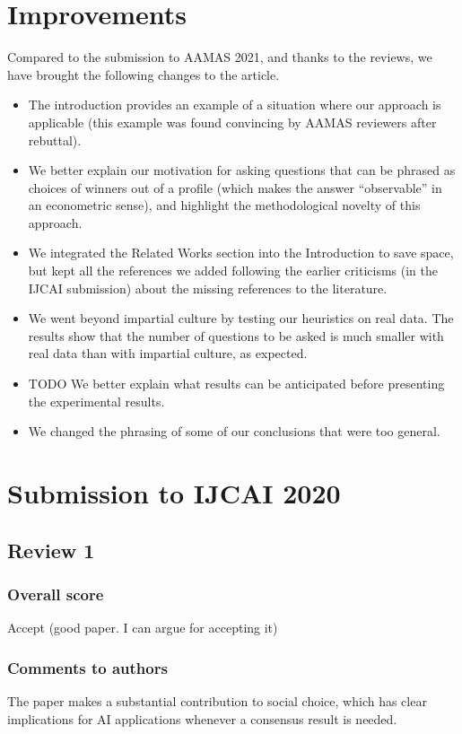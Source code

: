 \documentclass[version=3.21, pagesize, twoside=off, bibliography=totoc, DIV=calc, fontsize=12pt, a4paper]{scrartcl}
\begin{document}
\section{Improvements}
Compared to the submission to AAMAS 2021, and thanks to the reviews, we have brought the following changes to the article.

\begin{itemize}
	\item The introduction provides an example of a situation where our approach is applicable (this example was found convincing by AAMAS reviewers after rebuttal).
	\item We better explain our motivation for asking questions that can be phrased as choices of winners out of a profile (which makes the answer “observable” in an econometric sense), and highlight the methodological novelty of this approach.
	\item We integrated the Related Works section into the Introduction to save space, but kept all the references we added following the earlier criticisms (in the IJCAI submission) about the missing references to the literature.
	\item We went beyond impartial culture by testing our heuristics on real data. The results show that the number of questions to be asked is much smaller with real data than with impartial culture, as expected.
	\item TODO We better explain what results can be anticipated before presenting the experimental results. 
	\item We changed the phrasing of some of our conclusions that were too general.
\end{itemize}

\section{Submission to IJCAI 2020} 
\label{sec:reviews-ijcai}
\subsection{Review 1}
\subsubsection*{Overall score}
Accept (good paper. I can argue for accepting it)
\subsubsection*{Comments to authors}
The paper makes a substantial contribution to social choice, which has clear implications for AI applications whenever a consensus result is needed.
\end{document}
